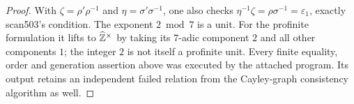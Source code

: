 \begin{proof}
With $\zeta=\rho'\rho^{-1}$ and $\eta=\sigma'\sigma^{-1}$,
one also checks $\eta^{-1}\zeta=\rho\sigma^{-1}=\varepsilon_1$,
exactly scan503's condition. The exponent $2\bmod7$ is a unit.
For the profinite formulation it lifts to $\widehat{\mathbb Z}^\times$
by taking its $7$-adic component $2$ and all other components
$1$; the integer $2$ is not itself a profinite unit. Every finite
equality, order and generation assertion above was executed by
the attached program. Its output retains an independent failed
relation from the Cayley-graph consistency algorithm as well.
\end{proof}
